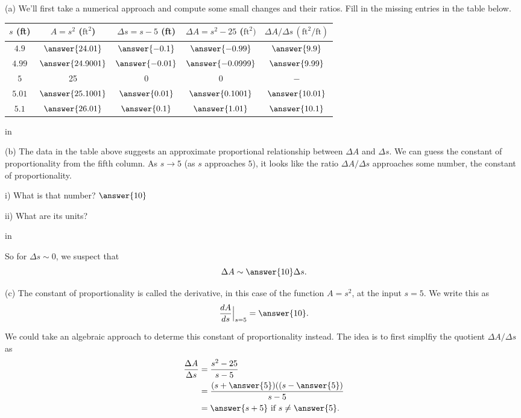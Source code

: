 \documentclass{ximera}
\newcommand{\pskip}{\vskip 0.1 in}
\begin{document}
\begin{question}  \label{Qfrdsft4t4tt}
(a) We'll first take a numerical approach and compute some small changes and their ratios. Fill in the missing entries in the table below.

\begin{center}
  \begin{tabular}{ | c| c | c | c | c |}
    \hline
    $s$ (ft) & $A = s^2$ ($\text{ft}^2$) & $\Delta s = s-5$ (ft)  & $\Delta A = s^2 - 25$ ($\text{ft}^2)$ & $\Delta A/\Delta s \, (\text{ft}^2/\text{ft})$ \\ \hline
    $4.9$ & $\answer{24.01}$ & $\answer{-0.1}$ &  $\answer{-0.99}$ & $\answer{9.9}$ \\ \hline
    $4.99$ & $\answer{24.9001}$ & $\answer{-0.01}$ &  $\answer{-0.0999}$ & $\answer{9.99}$ \\ \hline
    $5$  &  25 & $0$ & $0$ & $-$  \\ \hline
    $5.01$ & $\answer{25.1001}$ & $\answer{0.01}$ &  $\answer{0.1001}$ & $\answer{10.01}$ \\ \hline
    $5.1$ & $\answer{26.01}$ & $\answer{0.1}$ &  $\answer{1.01}$ & $\answer{10.1}$ \\ \hline
    \hline
  \end{tabular}
\end{center}

\pskip

(b) The data in the table above suggests an approximate proportional relationship between $\Delta A$ and $\Delta s$. We can guess the constant of proportionality from the fifth column. As $s\to 5$ (as $s$ approaches $5$), it looks like the ratio $\Delta A/\Delta s$ approaches some number, the constant of proportionality.

i) What is that number? $\answer{10}$

ii) What are its units?

\pskip

So for $\Delta s \sim 0$, we suspect that
\[
   \Delta A \sim \answer{10} \Delta s .
\]

(c) The constant of proportionality is called the derivative, in this case of the function $A=s^2$, at the input $s=5$. We write this as
\[
   \frac{dA}{ds}\Big|_{s=5} = \answer{10} .
\]

We could take an algebraic approach to determe this constant of proportionality instead. The idea is to first simplfiy the quotient $\Delta A/\Delta s$ as
\begin{align*}
            \frac{\Delta A}{\Delta s} &= \frac{s^2-25}{s-5}  \\
                                                &= \frac{(s + \answer{5})((s - \answer{5})}{s-5} \\
                                               &= \answer{s+5} \text{ if } s\neq {\answer{5}} .
\end{align*}


\end{question}
\end{document}
